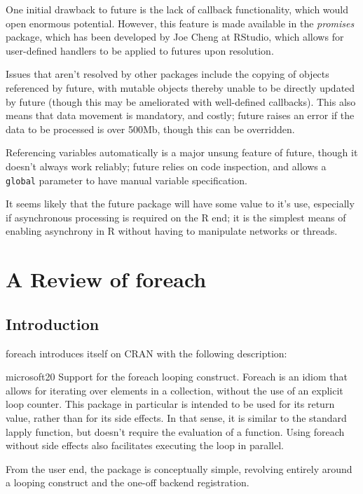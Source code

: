 \documentclass[a4paper,10pt]{article}
\begin{document}
One initial drawback to future is the lack of callback functionality, which
would open enormous potential. However, this feature is made available in the
\textit{promises} package, which has been developed by Joe Cheng at RStudio,
which allows for user-defined handlers to be applied to futures upon
resolution\cite{Cheng19}.

Issues that aren't resolved by other packages include the copying of objects
referenced by future, with mutable objects thereby unable to be directly
updated by future (though this may be ameliorated with well-defined callbacks).
This also means that data movement is mandatory, and costly; future raises an
error if the data to be processed is over 500Mb, though this can be overridden.

Referencing variables automatically is a major unsung feature of future, though
it doesn't always work reliably; future relies on code inspection, and allows a
\texttt{global} parameter to have manual variable specification.

It seems likely that the future package will have some value to it's use,
especially if asynchronous processing is required on the R end; it is the
simplest means of enabling asynchrony in R without having to manipulate
networks or threads.

\section{A Review of foreach}

\subsection{Introduction}
\label{sec:introduction}

foreach introduces itself on CRAN with the following description:
\begin{displaycquote}{microsoft20}
	Support for the foreach looping construct. Foreach is an idiom that
	allows for iterating over elements in a collection, without the use
	of an explicit loop counter. This package in particular is intended
	to be used for its return value, rather than for its side effects.
	In that sense, it is similar to the standard lapply function, but
	doesn't require the evaluation of a function. Using foreach without
	side effects also facilitates executing the loop in parallel.
\end{displaycquote}

From the user end, the package is conceptually simple, revolving
entirely around a looping construct and the one-off backend
registration.
\end{document}
